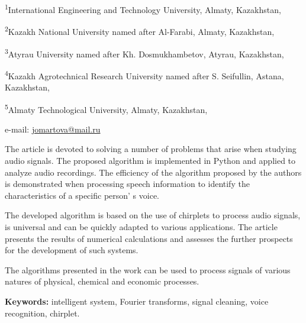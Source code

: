 \begin{affiliation}
\textsuperscript{1}International Engineering and Technology University, Almaty, Kazakhstan,

\textsuperscript{2}Kazakh National University named after Al-Farabi, Almaty, Kazakhstan,

\textsuperscript{3}Atyrau University named after Kh. Dosmukhambetov, Atyrau, Kazakhstan,

\textsuperscript{4}Kazakh Agrotechnical Research University named after S. Seifullin, Astana, Kazakhstan,

\textsuperscript{5}Almaty Technological University, Almaty, Kazakhstan,

e-mail: \href{mailto:jomartova@mail.ru}{jomartova@mail.ru}
\end{affiliation}

The article is devoted to solving a number of problems that arise when
studying audio signals. The proposed algorithm is implemented in Python
and applied to analyze audio recordings. The efficiency of the algorithm
proposed by the authors is demonstrated when processing speech
information to identify the characteristics of a specific
person' s voice.

The developed algorithm is based on the use of chirplets to process
audio signals, is universal and can be quickly adapted to various
applications. The article presents the results of numerical calculations
and assesses the further prospects for the development of such systems.

The algorithms presented in the work can be used to process signals of
various natures of physical, chemical and economic processes.

{\bfseries Keywords:} intelligent system, Fourier transforms, signal
cleaning, voice recognition, chirplet.

